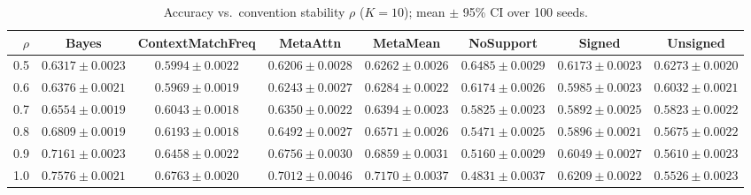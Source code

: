 \begin{table}[t]
\centering
\footnotesize
\caption{Accuracy vs.\ convention stability $\rho$ ($K=10$); mean $\pm$ 95\% CI over 100 seeds.}
\label{tab:rhosweep}
\begin{tabular}{rccccccc}
\toprule
$\rho$ & Bayes & ContextMatchFreq & MetaAttn & MetaMean & NoSupport & Signed & Unsigned \\
\midrule
0.5 & $0.6317 \pm 0.0023$ & $0.5994 \pm 0.0022$ & $0.6206 \pm 0.0028$ & $0.6262 \pm 0.0026$ & $0.6485 \pm 0.0029$ & $0.6173 \pm 0.0023$ & $0.6273 \pm 0.0020$ \\
0.6 & $0.6376 \pm 0.0021$ & $0.5969 \pm 0.0019$ & $0.6243 \pm 0.0027$ & $0.6284 \pm 0.0022$ & $0.6174 \pm 0.0026$ & $0.5985 \pm 0.0023$ & $0.6032 \pm 0.0021$ \\
0.7 & $0.6554 \pm 0.0019$ & $0.6043 \pm 0.0018$ & $0.6350 \pm 0.0022$ & $0.6394 \pm 0.0023$ & $0.5825 \pm 0.0023$ & $0.5892 \pm 0.0025$ & $0.5823 \pm 0.0022$ \\
0.8 & $0.6809 \pm 0.0019$ & $0.6193 \pm 0.0018$ & $0.6492 \pm 0.0027$ & $0.6571 \pm 0.0026$ & $0.5471 \pm 0.0025$ & $0.5896 \pm 0.0021$ & $0.5675 \pm 0.0022$ \\
0.9 & $0.7161 \pm 0.0023$ & $0.6458 \pm 0.0022$ & $0.6756 \pm 0.0030$ & $0.6859 \pm 0.0031$ & $0.5160 \pm 0.0029$ & $0.6049 \pm 0.0027$ & $0.5610 \pm 0.0023$ \\
1.0 & $0.7576 \pm 0.0021$ & $0.6763 \pm 0.0020$ & $0.7012 \pm 0.0046$ & $0.7170 \pm 0.0037$ & $0.4831 \pm 0.0037$ & $0.6209 \pm 0.0022$ & $0.5526 \pm 0.0023$ \\
\bottomrule
\end{tabular}
\end{table}

